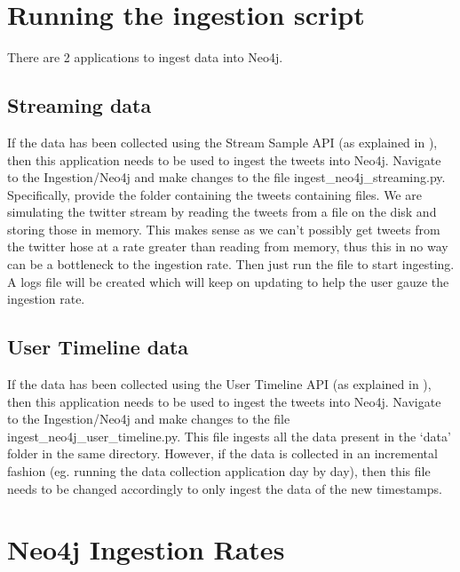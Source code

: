 \documentclass[letterpaper,10pt,english]{sphinxmanual}
\begin{document}
\section{Running the ingestion script}
\label{\detokenize{neo4j_data_ingestion:running-the-ingestion-script}}
There are 2 applications to ingest data into Neo4j.


\subsection{Streaming data}
\label{\detokenize{neo4j_data_ingestion:streaming-data}}
If the data has been collected using the Stream Sample API (as explained in {\hyperref[\detokenize{twitter_stream:stream-sample-api}]{}}), then this application needs to be used to ingest the tweets into Neo4j. Navigate to the Ingestion/Neo4j and make changes to the file ingest\_neo4j\_streaming.py. Specifically, provide the folder containing the tweets containing files. We are simulating the twitter stream by reading the tweets from a file on the disk and storing those in memory. This makes sense as we can’t possibly get tweets from the twitter hose at a rate greater than reading from memory, thus this in no way can be a bottleneck to the ingestion rate. Then just run the file  to start ingesting. A logs file will be created which will keep on updating to help the user gauze the ingestion rate.


\subsection{User Timeline data}
\label{\detokenize{neo4j_data_ingestion:user-timeline-data}}
If the data has been collected using the User Timeline API (as explained in {\hyperref[\detokenize{twitter_stream:user-timeline-api}]{}}), then this application needs to be used to ingest the tweets into Neo4j. Navigate to the Ingestion/Neo4j and make changes to the file ingest\_neo4j\_user\_timeline.py. This file ingests all the data present in the ‘data’ folder in the same directory. However, if the data is collected in an incremental fashion (eg. running the data collection application day by day), then this file needs to be changed accordingly to only ingest the data of the new timestamps.


\section{Neo4j Ingestion Rates}
\label{\detokenize{neo4j_data_ingestion:neo4j-ingestion-rates}}
\noindent{}
\end{document}
